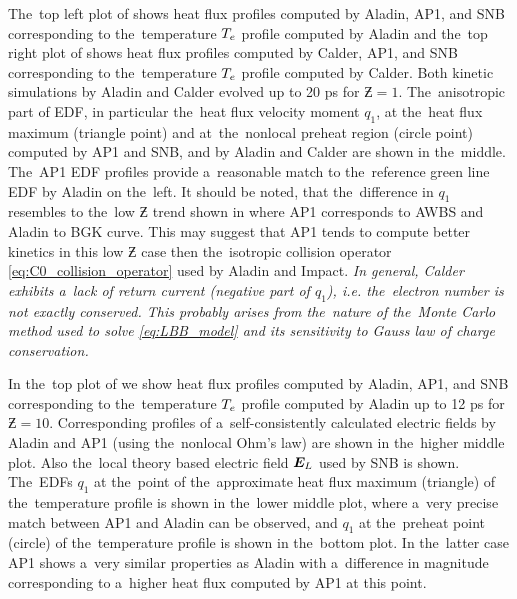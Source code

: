 The~top left plot of  shows heat flux 
profiles computed by Aladin, AP1, and SNB corresponding to the~temperature 
$T_e$ profile computed by Aladin and the~top right plot of 
 shows heat flux profiles computed by Calder, 
AP1, and SNB corresponding to the~temperature $T_e$ profile computed by Calder.
Both kinetic simulations by Aladin and Calder evolved up to 20 ps for 
$\Zbar = 1$. 
The~anisotropic part of EDF, in particular the~heat flux velocity moment $q_1$, 
at the~heat flux maximum (triangle point) and at~the~nonlocal preheat region 
(circle point) computed by AP1 and SNB, and by Aladin and Calder are shown 
in the~middle. %
The~AP1 EDF profiles provide a~reasonable match to 
the~reference green line EDF by Aladin on the~left. It should be noted, 
that the~difference in $q_1$ resembles to the~low $\Zbar$ trend
shown in  where AP1 corresponds to AWBS and Aladin to
BGK curve. This may suggest that AP1 tends 
to compute better kinetics in this low $\Zbar$ case then 
the~isotropic collision operator
\eqref{eq:C0_collision_operator} used by Aladin and Impact.
\textit{In general, Calder exhibits a~lack of 
return current (negative part of $q_1$), i.e. the~electron number is not 
exactly conserved. This probably arises from the~nature of the~Monte Carlo 
method used to solve \eqref{eq:LBB_model} and its sensitivity to Gauss law
of charge conservation.}

In the~top plot of  we show heat flux profiles
computed by Aladin, AP1, and SNB corresponding to the~temperature $T_e$ profile 
computed by Aladin up to 12 ps for $\Zbar = 10$. Corresponding profiles of 
a~self-consistently calculated electric fields by Aladin and AP1 
(using the~nonlocal Ohm's law) are shown in the~higher middle plot.
Also the~local theory based electric field $\boldsymbol{E}_L$ used by SNB is shown.
The~EDFs $q_1$ at the~point of the~approximate heat flux maximum (triangle) of
the~temperature profile is shown in the~lower middle plot, 
where a~very precise match between AP1 and Aladin can be observed, 
and $q_1$ at the~preheat point (circle) of the~temperature profile is shown 
in the~bottom plot. In the~latter case
AP1 shows a~very similar properties as Aladin with a~difference in magnitude
corresponding to a~higher heat flux computed by AP1 at this point. 

